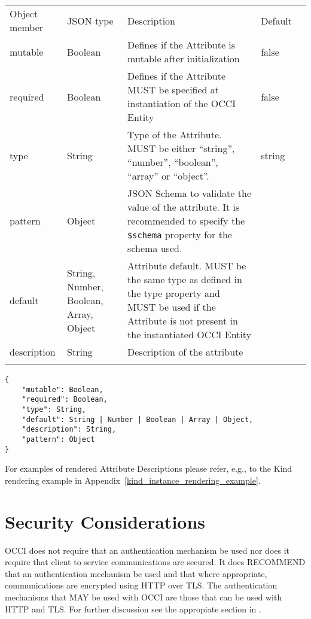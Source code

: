 \documentclass[10pt,a4paper]{article}
\begin{document}
 {
    \begin{tabularx}{\textwidth}{llXll}
    \toprule
    Object member & JSON type & Description & Default \\
    \colrule
    mutable & Boolean & Defines if the Attribute is mutable after initialization
& false \\

    required & Boolean & Defines if the Attribute MUST be specified at
instantiation of the OCCI Entity & false \\

    type & String & Type of the Attribute. MUST be either ``string'', ``number'',
``boolean'', ``array'' or ``object''. & string \\

    pattern & Object & JSON Schema \cite{json-schema} to validate the value of the attribute. It is recommended to specify the \texttt{\$schema} property for the schema used. & {} \\

    default & String, Number, Boolean, Array, Object & Attribute default. MUST be the same
type as defined in the type property and MUST  be used if the Attribute is not
present in the instantiated OCCI Entity & \\

    description & String & Description of the attribute & \\
    \botrule
    \end{tabularx}
}
\begin{lstlisting}
{
    "mutable": Boolean,
    "required": Boolean,
    "type": String,
    "default": String | Number | Boolean | Array | Object,
    "description": String,
    "pattern": Object
}
\end{lstlisting}

For examples of rendered Attribute Descriptions please refer, e.g., to the Kind rendering example in Appendix~\ref{kind_instance_rendering_example}.

\section{Security Considerations}
OCCI does not require that an authentication mechanism be used nor
does it require that client to service communications are secured. It
does RECOMMEND that an authentication mechanism be used and that where
appropriate, communications are encrypted using HTTP over TLS. The
authentication mechanisms that MAY be used with OCCI are those that
can be used with HTTP and TLS. For further discussion see the
appropiate section in \cite{occi:protocol}.
\end{document}
